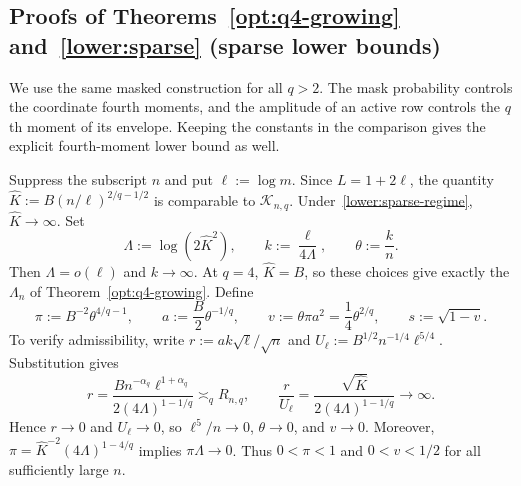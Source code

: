 \documentclass[11pt,letterpaper]{article}
\theoremstyle{remark}
\begin{document}
\subsection{Proofs of Theorems~\ref*{opt:q4-growing} and~\ref*{lower:sparse} (sparse lower bounds)}
\label{app:q4-growing}

We use the same masked construction for all \(q>2\). The mask
probability controls the coordinate fourth moments, and the amplitude
of an active row controls the \(q\)th moment of its envelope. Keeping
the constants in the comparison gives the explicit fourth-moment
lower bound as well.

Suppress the subscript \(n\) and put \(\ell:=\log m\). Since
\(L=1+2\ell\), the quantity
\(\widehat K:=B(n/\ell)^{2/q-1/2}\) is comparable to \(\mathcal K_{n,q}\).
Under~\eqref{lower:sparse-regime}, \(\widehat K\to\infty\). Set
\[
 \Lambda:=\log(2\widehat K^2),\qquad k:=\frac{\ell}{4\Lambda},
 \qquad \theta:=\frac{k}{n}.
\]
Then \(\Lambda=o(\ell)\) and \(k\to\infty\).
At \(q=4\), \(\widehat K=B\), so these choices give exactly
the \(\Lambda_n\) of Theorem~\ref{opt:q4-growing}. Define
\begin{equation}
 \pi:=B^{-2}\theta^{4/q-1},\qquad a:=\frac B2\theta^{-1/q},
 \qquad v:=\theta\pi a^2=\frac14\theta^{2/q},\qquad s:=\sqrt{1-v}.
 \label{q4:eq:sparse-parameters}
\end{equation}
To verify admissibility, write \(r:=ak\sqrt\ell/\sqrt n\) and
\(U_\ell:=B^{1/2}n^{-1/4}\ell^{5/4}\). Substitution gives
\[
 r=\frac{B n^{-\alpha_q}\ell^{1+\alpha_q}}{2(4\Lambda)^{1-1/q}}
 \asymp_q R_{n,q},\qquad
 \frac r{U_\ell}=\frac{\sqrt{\widehat K}}{2(4\Lambda)^{1-1/q}}\to\infty.
\]
Hence \(r\to0\) and \(U_\ell\to0\), so \(\ell^5/n\to0\),
\(\theta\to0\), and \(v\to0\). Moreover,
\(\pi=\widehat K^{-2}(4\Lambda)^{1-4/q}\) implies \(\pi\Lambda\to0\).
Thus \(0<\pi<1\) and \(0<v<1/2\) for all sufficiently large \(n\).
\end{document}
